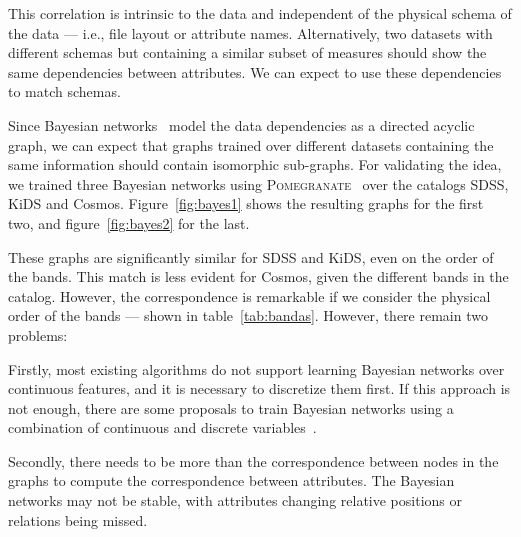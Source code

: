 This correlation is intrinsic to the data and independent of the physical
schema of the data --- i.e., file layout or attribute names. Alternatively,
two datasets with different schemas but containing a similar subset of
measures should show the same dependencies between attributes. We can
expect to use these dependencies to match schemas\footnotemark.


Since Bayesian networks~\cite{pearl1988}  model the data dependencies
as a directed acyclic graph, we can expect that graphs trained over different
datasets containing the same information should contain isomorphic sub-graphs.
For validating the idea, we trained three Bayesian networks using\linebreak
\textsc{Pomegranate}~\cite{schreiber_pomegranate_2017} over the catalogs
\gls{SDSS}, \gls{KiDS} and \gls{Cosmos}. Figure~\ref{fig:bayes1} shows the
resulting graphs for the first two, and figure~\ref{fig:bayes2} for the last.

These graphs are significantly similar for \gls{SDSS} and \gls{KiDS},
even on the order of the bands. This match is less evident for \gls{Cosmos},
given the different bands in the catalog. However, the correspondence is
remarkable if we consider the physical order of the bands --- shown in table~\ref{tab:bandas}.
However, there remain two problems:

Firstly, most existing algorithms do not support learning Bayesian networks over continuous features,
and it is necessary to discretize them first. If this approach is not enough, there are some
proposals to train Bayesian networks using a combination of continuous and discrete
variables~\cite{Lucas2015,chen2017}.

Secondly, there needs to be more than the correspondence between nodes in the graphs to compute
the correspondence between attributes. The Bayesian networks may not be stable, with
attributes changing relative positions or relations being missed.


